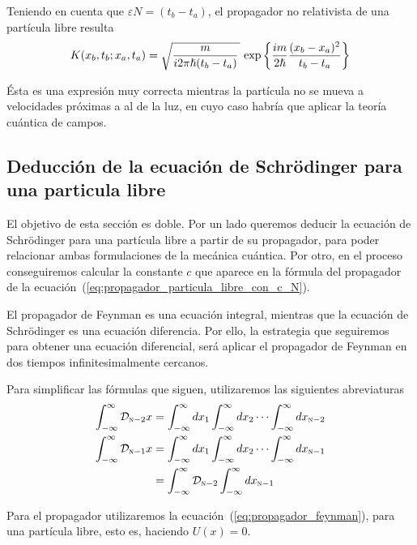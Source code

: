 Teniendo en cuenta que $\varepsilon N = (t_b-t_a)$, el propagador no
relativista de una partícula libre resulta
\begin{equation}\label{eq:propagador_particula_libre}
  K(x_b,t_b;x_a,t_a)
  =
    \sqrt{\dfrac{m}{i2\pi\hslash(t_b-t_a)}\kern1.5pt}\,
    \exp\left\{\frac{im}{2\hslash}\dfrac{(x_b-x_a)^2}{t_b-t_a}\right\}
\end{equation}

Ésta es una expresión muy correcta mientras la partícula no se mueva a
velocidades próximas a al de la luz, en cuyo caso habría que aplicar
la teoría cuántica de campos. 

\subsection{Deducción de la ecuación de Schrödinger para una particula libre}
El objetivo de esta sección es doble. Por un lado queremos deducir la
ecuación de Schrödinger para una partícula libre a partir de su
propagador, para poder relacionar ambas formulaciones de la mecánica
cuántica. Por otro, en el proceso conseguiremos calcular la constante
$c$ que aparece en la fórmula del propagador de la
ecuación~(\ref{eq:propagador_particula_libre_con_c_N}).

El propagador de Feynman es una ecuación integral, mientras que la
ecuación de Schrödinger es una ecuación diferencia. Por ello, la
estrategia que seguiremos para obtener una ecuación diferencial, será
aplicar el propagador de Feynman en dos tiempos infinitesimalmente
cercanos.

Para simplificar las fórmulas que siguen, utilizaremos las siguientes
abreviaturas
\begin{align*}
  \int_{-\infty}^{\infty}\mathcal{D}_{\textsc{n}-2} x
  &=
    \int_{-\infty}^{\infty} dx_1
    \int_{-\infty}^{\infty} dx_2
    \cdots
    \int_{-\infty}^{\infty} dx_{\textsc{n}-2}
  \\
  \int_{-\infty}^{\infty}\mathcal{D}_{\textsc{n}-1} x
  &=
    \int_{-\infty}^{\infty} dx_1
    \int_{-\infty}^{\infty} dx_2
    \cdots
    \int_{-\infty}^{\infty} dx_{\textsc{n}-1}\\
  &=
    \int_{-\infty}^{\infty}\mathcal{D}_{\textsc{n}-2}
    \int_{-\infty}^{\infty} dx_{\textsc{n}-1}
\end{align*}

Para el propagador utilizaremos la
ecuación~(\ref{eq:propagador_feynman}), para una partícula libre, esto
es, haciendo $U(x)=0$.

